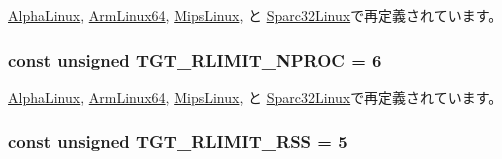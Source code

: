 \hyperlink{classAlphaLinux_a7eca1a56bf2a00dce74320c95a0b176e}{AlphaLinux}, \hyperlink{classArmLinux64_a599454267926920de3bd5a488bda3e03af2a76cff253996593d8c22981696e110}{ArmLinux64}, \hyperlink{classMipsLinux_a7eca1a56bf2a00dce74320c95a0b176e}{MipsLinux}, と \hyperlink{classSparc32Linux_a7eca1a56bf2a00dce74320c95a0b176e}{Sparc32Linux}で再定義されています。\hypertarget{classLinux_af16b609dcc51ebef365e8258e28d777c}{
\subsubsection[{TGT\_\-RLIMIT\_\-NPROC}]{\setlength{\rightskip}{0pt plus 5cm}const unsigned {\bf TGT\_\-RLIMIT\_\-NPROC} = 6}}
\label{classLinux_af16b609dcc51ebef365e8258e28d777c}


\hyperlink{classAlphaLinux_af16b609dcc51ebef365e8258e28d777c}{AlphaLinux}, \hyperlink{classArmLinux64_a599454267926920de3bd5a488bda3e03af653a805832a388dbc3548d5d06150cb}{ArmLinux64}, \hyperlink{classMipsLinux_af16b609dcc51ebef365e8258e28d777c}{MipsLinux}, と \hyperlink{classSparc32Linux_af16b609dcc51ebef365e8258e28d777c}{Sparc32Linux}で再定義されています。\hypertarget{classLinux_a0821c1df130aa7cf89fefd5aea653d9e}{
\subsubsection[{TGT\_\-RLIMIT\_\-RSS}]{\setlength{\rightskip}{0pt plus 5cm}const unsigned {\bf TGT\_\-RLIMIT\_\-RSS} = 5}}
\label{classLinux_a0821c1df130aa7cf89fefd5aea653d9e}


